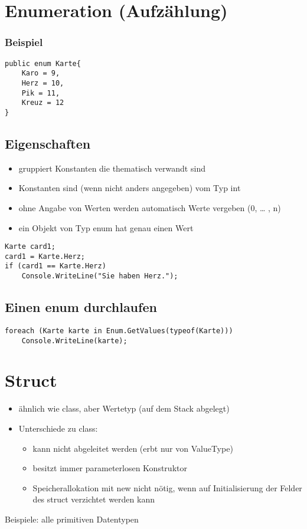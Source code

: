 \section{Enumeration (Aufzählung)}
\subsubsection*{Beispiel}
\begin{lstlisting}[language={[Sharp]C}]
public enum Karte{
	Karo = 9,
	Herz = 10,
	Pik = 11,
	Kreuz = 12
}
\end{lstlisting}

\subsection{Eigenschaften}

\begin{itemize}
\item gruppiert Konstanten die thematisch verwandt sind
\item Konstanten sind (wenn nicht anders angegeben) vom Typ int
\item ohne Angabe von Werten werden automatisch Werte vergeben (0, … , n)
\item ein Objekt von Typ enum hat genau einen Wert
\end{itemize}
\begin{lstlisting}[language={[Sharp]C}]
Karte card1;
card1 = Karte.Herz;
if (card1 == Karte.Herz)
	Console.WriteLine("Sie haben Herz.");
\end{lstlisting}

\subsection{Einen enum durchlaufen}
\begin{lstlisting}[language={[Sharp]C}]
foreach (Karte karte in Enum.GetValues(typeof(Karte)))
	Console.WriteLine(karte);
\end{lstlisting}

\section{Struct}

\begin{itemize}
\item ähnlich wie class, aber Wertetyp (auf dem Stack abgelegt)
\item Unterschiede zu class:
\begin{itemize}
\item kann nicht abgeleitet werden (erbt nur von ValueType)
\item besitzt immer parameterlosen Konstruktor
\item Speicherallokation mit new nicht nötig, wenn auf Initialisierung der Felder des struct verzichtet werden kann
\end{itemize}
\end{itemize}
Beispiele: alle primitiven Datentypen

